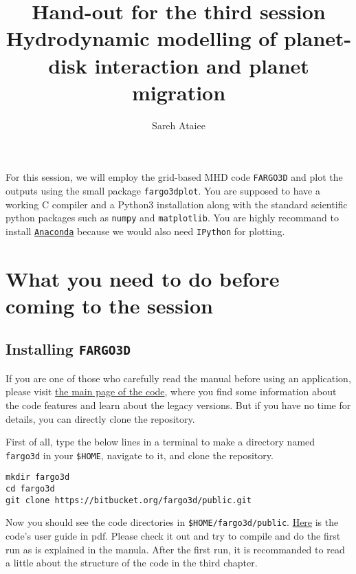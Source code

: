 \documentclass[14pt]{scrartcl}
\title{{\large Hand-out for the third session} \\ Hydrodynamic modelling of planet-disk interaction and planet migration}
\author{\large Sareh Ataiee}
\date{}
\begin{document}
\maketitle

For this session, we will employ the grid-based MHD code \texttt{FARGO3D} and plot the outputs using the small package \texttt{fargo3dplot}. You are supposed to have a working C compiler and a Python3 installation along with the standard scientific python packages such as \texttt{numpy} and \texttt{matplotlib}.  You are highly recommand to install \href{https://www.anaconda.com/}{\texttt{Anaconda}} because we would also need  \texttt{IPython} for plotting.

\section{What you need to do before coming to the session} \label{sec:before}
\subsection{Installing \texttt{FARGO3D}} \label{fargo3d}

If you are one of those who carefully read the manual before using an application, please visit \href{http://fargo.in2p3.fr/}{the main page of the code}, where you find some information about the code features and learn about the legacy versions. But if you have no time for details, you can directly clone the repository. 
	
First of all, type the below lines in a terminal to make a directory named \texttt{fargo3d} in your \verb!$HOME!, navigate to it, and clone the repository.	
\begin{verbatim}
mkdir fargo3d
cd fargo3d
git clone https://bitbucket.org/fargo3d/public.git
\end{verbatim}

Now you should see the code directories in \verb!$HOME/fargo3d/public!. \href{http://fargo.in2p3.fr/manuals/FARGO3DUserGuide.pdf}{Here} is the code's user guide in pdf. Please check it out and try to compile and do the first run as is explained in the manula. After the first run, it is recommanded to read a little about the structure of the code in the third chapter. 
\end{document}
